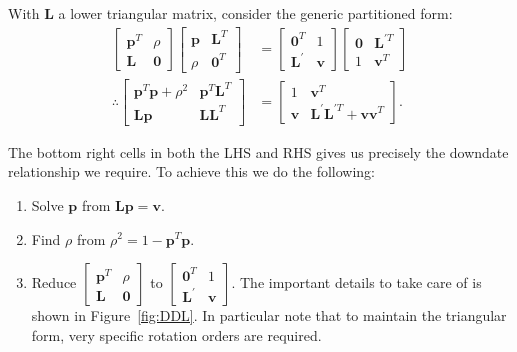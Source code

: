 \documentclass[oneside,english]{scrbook}
\begin{document}
With $\bm{L}$ a lower triangular matrix, consider the generic partitioned form:
\begin{align*}
  \begin{bmatrix}
    \bm{p}^T & \rho\\
    \bm{L} & \bm{0}
  \end{bmatrix}
  \begin{bmatrix}
    \bm{p} & \bm{L}^T\\
    \rho & \bm{0}^T
  \end{bmatrix}
  &=
  \begin{bmatrix}
    \bm{0}^T & 1\\
    \bm{L}^{'} & \bm{v}
  \end{bmatrix}
  \begin{bmatrix}
    \bm{0} & \bm{L}^{'T}\\
    1 & \bm{v}^T
  \end{bmatrix}\\
  \therefore
  \begin{bmatrix}
    \bm{p}^T\bm{p} + \rho^2 & \bm{p}^T\bm{L}^T\\
    \bm{L}\bm{p} & \bm{L}\bm{L}^T
  \end{bmatrix}
  &=
  \begin{bmatrix}
    1 & \bm{v}^T\\
    \bm{v} & \bm{L}^{'}\bm{L}^{'T}+\bm{v}\bm{v}^T
  \end{bmatrix}.
\end{align*}

The bottom right cells in both the LHS and RHS gives us precisely the
downdate relationship we require. To achieve this we do the following:
\begin{enumerate}
\item Solve $\bm{p}$ from $\bm{L}\bm{p} = \bm{v} $.
\item Find $\rho$ from $\rho^2 = 1- \bm{p}^T\bm{p}$.
\item Reduce
  $\begin{bmatrix}
  \bm{p}^T & \rho\\
  \bm{L} & \bm{0}
  \end{bmatrix}$
  to
  $\begin{bmatrix}
    \bm{0}^T & 1\\
    \bm{L}^{'} & \bm{v}
  \end{bmatrix}$.
  The important details to take care of is shown in
  Figure~\ref{fig:DDL}. In particular note that to maintain the
  triangular form, very specific rotation orders are required.
\end{enumerate}
\end{document}
